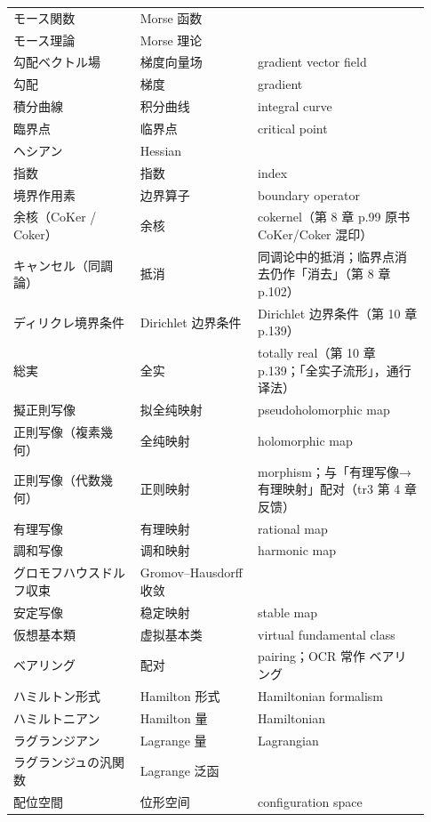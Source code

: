 \begin{longtable}{@{}>{\raggedright\arraybackslash}p{0.29\linewidth}>{\raggedright\arraybackslash}p{0.26\linewidth}>{\raggedright\arraybackslash}p{0.38\linewidth}@{}}
モース関数 & Morse \mbox{函数} &  \\
モース理論 & Morse \mbox{理论} &  \\
勾配ベクトル場 & \mbox{梯度向量场} & gradient vector field \\
勾配 & \mbox{梯度} & gradient \\
積分曲線 & \mbox{积分曲线} & integral curve \\
臨界点 & \mbox{临界点} & critical point \\
ヘシアン & Hessian &  \\
指数 & \mbox{指数} & index \\
境界作用素 & \mbox{边界算子} & boundary operator \\
余核（CoKer / Coker） & \mbox{余核} & cokernel（第 8 章 p.99 原书 CoKer/Coker 混印） \\
キャンセル（同調論） & \mbox{抵消} & 同调论中的抵消；临界点消去仍作「消去」（第 8 章 p.102） \\
ディリクレ境界条件 & Dirichlet \mbox{边界条件} & Dirichlet 边界条件（第 10 章 p.139） \\
総実 & \mbox{全实} & totally real（第 10 章 p.139；「全实子流形」，通行译法） \\
擬正則写像 & \mbox{拟全纯映射} & pseudoholomorphic map \\
正則写像（複素幾何） & \mbox{全纯映射} & holomorphic map \\
正則写像（代数幾何） & \mbox{正则映射} & morphism；与「有理写像→有理映射」配对（tr3 第 4 章反馈） \\
有理写像 & \mbox{有理映射} & rational map \\
調和写像 & \mbox{调和映射} & harmonic map \\
グロモフ\textendash{}ハウスドルフ収束 & Gromov--Hausdorff \mbox{收敛} &  \\
安定写像 & \mbox{稳定映射} & stable map \\
仮想基本類 & \mbox{虚拟基本类} & virtual fundamental class \\
ベアリング & \mbox{配对} & pairing；OCR 常作 ベアリング \\
ハミルトン形式 & Hamilton \mbox{形式} & Hamiltonian formalism \\
ハミルトニアン & Hamilton \mbox{量} & Hamiltonian \\
ラグランジアン & Lagrange \mbox{量} & Lagrangian \\
ラグランジュの汎関数 & Lagrange \mbox{泛函} &  \\
配位空間 & \mbox{位形空间} & configuration space \\

\end{longtable}
